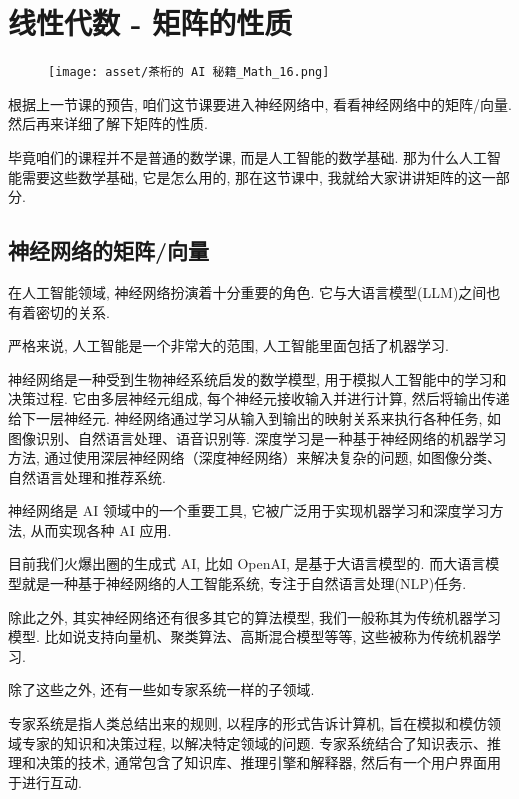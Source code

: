 \chapter{线性代数 - 矩阵的性质 }

\begin{figure}[ht]
  \centering
  \texttt{[image: asset/茶桁的 AI 秘籍\_Math\_16.png]}
\end{figure}

\newpage

根据上一节课的预告, 咱们这节课要进入神经网络中, 看看神经网络中的矩阵/向量. 然后再来详细了解下矩阵的性质. 

毕竟咱们的课程并不是普通的数学课, 而是人工智能的数学基础. 那为什么人工智能需要这些数学基础, 它是怎么用的, 那在这节课中, 我就给大家讲讲矩阵的这一部分. 

\section{神经网络的矩阵/向量}

在人工智能领域, 神经网络扮演着十分重要的角色. 它与大语言模型(LLM)之间也有着密切的关系. 

严格来说, 人工智能是一个非常大的范围, 人工智能里面包括了机器学习. 

神经网络是一种受到生物神经系统启发的数学模型, 用于模拟人工智能中的学习和决策过程. 它由多层神经元组成, 每个神经元接收输入并进行计算, 然后将输出传递给下一层神经元. 神经网络通过学习从输入到输出的映射关系来执行各种任务, 如图像识别、自然语言处理、语音识别等. 深度学习是一种基于神经网络的机器学习方法, 通过使用深层神经网络（深度神经网络）来解决复杂的问题, 如图像分类、自然语言处理和推荐系统. 

神经网络是 AI 领域中的一个重要工具, 它被广泛用于实现机器学习和深度学习方法, 从而实现各种 AI 应用. 

目前我们火爆出圈的生成式 AI, 比如 OpenAI, 是基于大语言模型的. 而大语言模型就是一种基于神经网络的人工智能系统, 专注于自然语言处理(NLP)任务. 

除此之外, 其实神经网络还有很多其它的算法模型, 我们一般称其为传统机器学习模型. 比如说支持向量机、聚类算法、高斯混合模型等等, 这些被称为传统机器学习. 

除了这些之外, 还有一些如专家系统一样的子领域. 

专家系统是指人类总结出来的规则, 以程序的形式告诉计算机, 旨在模拟和模仿领域专家的知识和决策过程, 以解决特定领域的问题. 专家系统结合了知识表示、推理和决策的技术, 通常包含了知识库、推理引擎和解释器, 然后有一个用户界面用于进行互动. 

